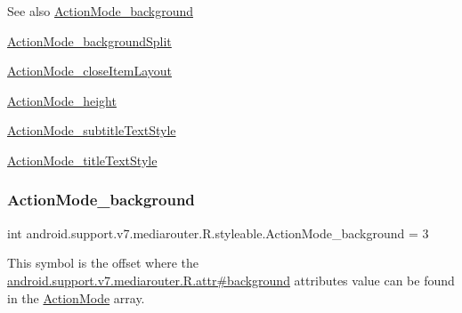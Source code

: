 \begin{DoxySeeAlso}{See also}
\hyperlink{classandroid_1_1support_1_1v7_1_1mediarouter_1_1R_1_1styleable_aa87c515bab8d3e31a7192b8646436959}{Action\+Mode\+\_\+background} 

\hyperlink{classandroid_1_1support_1_1v7_1_1mediarouter_1_1R_1_1styleable_a964de6792a0ef91d9a277bff3796c597}{Action\+Mode\+\_\+background\+Split} 

\hyperlink{classandroid_1_1support_1_1v7_1_1mediarouter_1_1R_1_1styleable_a544a453f2ea1703ee087d75cc3da448d}{Action\+Mode\+\_\+close\+Item\+Layout} 

\hyperlink{classandroid_1_1support_1_1v7_1_1mediarouter_1_1R_1_1styleable_a6b8d66b42ebc726d21097cf62e090d8a}{Action\+Mode\+\_\+height} 

\hyperlink{classandroid_1_1support_1_1v7_1_1mediarouter_1_1R_1_1styleable_a7c9b319454742dd79494960a4a144757}{Action\+Mode\+\_\+subtitle\+Text\+Style} 

\hyperlink{classandroid_1_1support_1_1v7_1_1mediarouter_1_1R_1_1styleable_a448e15fac45ca973519260e405b17757}{Action\+Mode\+\_\+title\+Text\+Style} 
\end{DoxySeeAlso}
\mbox{\label{classandroid_1_1support_1_1v7_1_1mediarouter_1_1R_1_1styleable_aa87c515bab8d3e31a7192b8646436959}} 
\subsubsection{\texorpdfstring{Action\+Mode\+\_\+background}{ActionMode\_background}}
{\footnotesize\ttfamily int android.\+support.\+v7.\+mediarouter.\+R.\+styleable.\+Action\+Mode\+\_\+background = 3\hspace{0.3cm}{\ttfamily [static]}}

This symbol is the offset where the \hyperlink{classandroid_1_1support_1_1v7_1_1mediarouter_1_1R_1_1attr_a3bafd93ea64f8ac92ba9d29c95112cea}{android.\+support.\+v7.\+mediarouter.\+R.\+attr\#background} attribute\textquotesingle{}s value can be found in the \hyperlink{classandroid_1_1support_1_1v7_1_1mediarouter_1_1R_1_1styleable_a4aa490e6088a98056876d4f9227193c8}{Action\+Mode} array.

